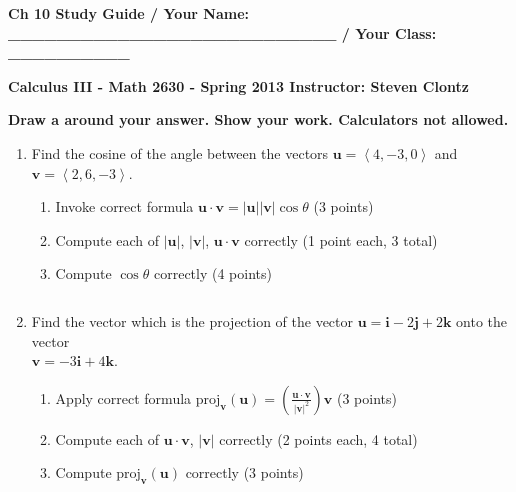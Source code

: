 \documentclass[12pt]{article}
\newcommand{\up}{$~$\vspace*{-0.7in}}
\newcommand{\liner}{\noindent\underline{\hspace*{7in}}}
\newcommand{\spac}{\hspace*{3em}}
\newcommand{\ds}{\displaystyle}
\renewcommand{\vec}{\mathbf}
\newcommand{\veci}{\vec{i}}
\newcommand{\vecj}{\vec{j}}
\newcommand{\veck}{\vec{k}}
\newcommand{\proj}{\mbox{proj}}
\newcommand{\<}{\left<}
\renewcommand{\>}{\right>}
\begin{document}
\up

{ \bf Ch 10 Study Guide / Your Name: \_\_\_\_\_\_\_\_\_\_\_\_\_\_\_\_\_\_\_\_\_\_\_\_\_\_\_ / Your Class: \_\_\_\_\_\_\_\_\_\_}

\vspace*{0.2in}

\centerline{ \bf Calculus III - Math 2630 - Spring 2013 \spac Instructor: Steven Clontz}

\vspace*{0.2in}

{\bf Draw a  around your answer. Show your work. Calculators not allowed.}

\indent\liner


\begin{enumerate}

\item Find the cosine of the angle between the vectors $\vec{u}=\<4,-3,0\>$ and $\vec{v}=\<2,6,-3\>$.

  \begin{enumerate}
\item Invoke correct formula $\vec{u}\cdot\vec{v} = |\vec{u}||\vec{v}|\cos \theta$ (3 points)
\item Compute each of $|\vec{u}|$, $|\vec{v}|$, $\vec{u}\cdot\vec{v}$ correctly (1 point each, 3 total)
\item Compute $\cos \theta$ correctly (4 points)
  \end{enumerate}

\vspace*{6.5in}

\liner
\newpage\up

\item Find the vector which is the projection of the vector $\vec{u} = \veci-2\vecj+2\veck$ onto the vector \\$\vec{v}=-3\veci+4\veck$.

\begin{enumerate}
\item Apply correct formula $\ds\proj_{\vec{v}}(\vec{u}) = \left(\frac{\vec{u}\cdot\vec{v}}{|\vec{v}|^2}\right)\vec{v}$ (3 points)
\item Compute each of $\vec{u}\cdot\vec{v}$, $|\vec{v}|$ correctly (2 points each, 4 total)
\item Compute $\proj_{\vec{v}}(\vec{u})$ correctly (3 points)
\end{enumerate}

\vspace*{7in}


\end{enumerate}
\end{document}
